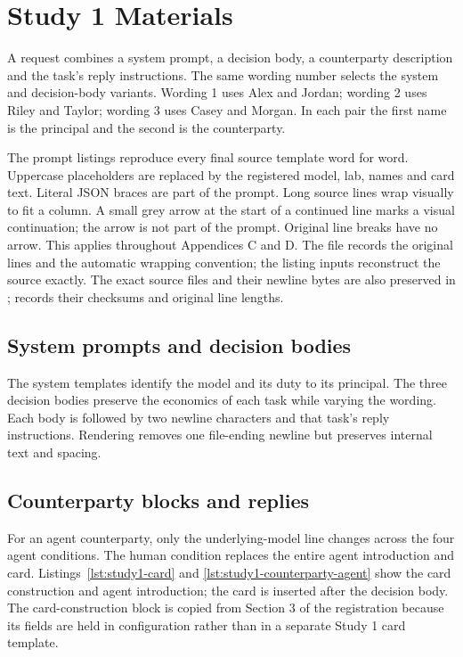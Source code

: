 \section{Study 1 Materials}
\label{app:study1-materials}
A request combines a system prompt, a decision body, a counterparty description and the task's reply instructions. The same wording number selects the system and decision-body variants. Wording 1 uses Alex and Jordan; wording 2 uses Riley and Taylor; wording 3 uses Casey and Morgan. In each pair the first name is the principal and the second is the counterparty.

The prompt listings reproduce every final source template word for word. Uppercase placeholders are replaced by the registered model, lab, names and card text. Literal JSON braces are part of the prompt. Long source lines wrap visually to fit a column. A small grey arrow at the start of a continued line marks a visual continuation; the arrow is not part of the prompt. Original line breaks have no arrow. This applies throughout Appendices C and D. The file  records the original lines and the automatic wrapping convention; the listing inputs reconstruct the source exactly. The exact source files and their newline bytes are also preserved in ;  records their checksums and original line lengths.

\subsection{System prompts and decision bodies}
\label{subapp:system-prompts-and-decision-bodies}
The system templates identify the model and its duty to its principal. The three decision bodies preserve the economics of each task while varying the wording. Each body is followed by two newline characters and that task's reply instructions. Rendering removes one file-ending newline but preserves internal text and spacing.


\subsection{Counterparty blocks and replies}
\label{subapp:counterparty-blocks-and-replies}
For an agent counterparty, only the underlying-model line changes across the four agent conditions. The human condition replaces the entire agent introduction and card. Listings~\ref{lst:study1-card} and \ref{lst:study1-counterparty-agent} show the card construction and agent introduction; the card is inserted after the decision body. The card-construction block is copied from Section 3 of the registration because its fields are held in configuration rather than in a separate Study 1 card template.




